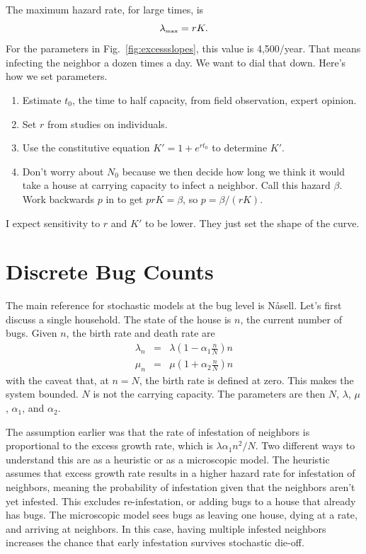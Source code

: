 \documentclass{article}
\begin{document}
The maximum hazard rate, for large times, is
\begin{equation}
  \lambda_{\mbox{\tiny max}}=rK.
\end{equation}
For the parameters in Fig.~\ref{fig:excessslopes}, this value is
4,500/year. That means infecting the neighbor a dozen times a day.
We want to dial that down.
Here's how we set parameters.
\begin{enumerate}
  \item Estimate $t_0$, the time to half capacity, from field
        observation, expert opinion.
  \item Set $r$ from studies on individuals.
  \item Use the constitutive equation $K'=1+e^{rt_0}$ to
        determine $K'$.
  \item Don't worry about $N_0$ because we then decide
        how long we think it would take a house at carrying
        capacity to infect a neighbor. Call this hazard
        $\beta$. Work backwards $p$ in
        to get $prK=\beta$, so $p=\beta/(rK)$.
\end{enumerate}
I expect sensitivity to $r$ and $K'$ to be lower. They
just set the shape of the curve.



\section{Discrete Bug Counts}
The main reference for stochastic models at the bug level
is N{\aa}sell\cite{Nasell2001}. Let's first discuss a single household.
The state of the house is $n$, the current number of bugs.
Given $n$, the birth rate and death rate are
\begin{eqnarray}
  \lambda_n & = & \lambda\left(1-\alpha_1\frac{n}{N}\right)n \\
  \mu_n & = & \mu\left(1+\alpha_2\frac{n}{N}\right)n
\end{eqnarray}
with the caveat that, at $n=N$, the birth rate is defined at zero.
This makes the system bounded. $N$ is not the carrying capacity.
The parameters are then $N$, $\lambda$, $\mu$, $\alpha_1$, and $\alpha_2$.

The assumption earlier was that the rate of infestation of
neighbors is proportional to the excess growth rate, which is
$\lambda\alpha_1n^2/N$. Two different ways to understand this
are as a heuristic or as a microscopic model. The heuristic assumes
that excess growth rate results in a higher hazard rate for infestation
of neighbors, meaning the probability of infestation given that the
neighbors aren't yet infested. This excludes re-infestation, or adding
bugs to a house that already has bugs. The microscopic model
sees bugs as leaving one house, dying at a rate, and arriving at neighbors.
In this case, having multiple infested neighbors increases the chance
that early infestation survives stochastic die-off.
\end{document}
